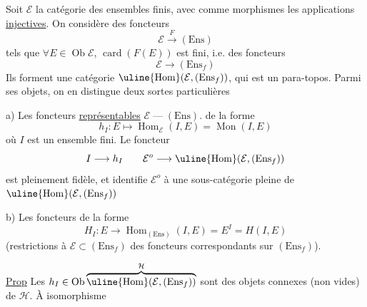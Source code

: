 Soit $\mathcal E$ la catégorie des ensembles finis, avec comme
morphismes les applications \uline{injectives}. On
considère des foncteurs
\[
\mathcal E\xrightarrow{F}(\mathrm{Ens})
\]
tels que $\forall E\in\operatorname{Ob}\mathcal E$, $\operatorname{card}(F(E))$ est fini, i.e. des
foncteurs
\[
\mathcal E\longrightarrow(\mathrm{Ens}_f)
\]
Ils forment une catégorie $\uline{\operatorname{Hom}}(\mathcal E,(\mathrm{Ens}_f))$,
qui est un para-topos. Parmi ses objets, on
en distingue deux sortes particulières

a) Les foncteurs \uline{représentables} $\mathcal E\mathbin{\text{---}}(\mathrm{Ens})$.
de la forme
\[
h_I:E\longmapsto\operatorname{Hom}_{\mathcal E}(I,E)=\operatorname{Mon}(I,E)
\]
où $I$ est un ensemble fini. Le foncteur
\[
I\longrightarrow h_I\qquad\mathcal E^o\longrightarrow\uline{\operatorname{Hom}}(\mathcal E,(\mathrm{Ens}_f))
\]
est pleinement fidèle, et identifie $\mathcal E^o$ à
une sous-catégorie pleine de $\uline{\operatorname{Hom}}(\mathcal E,(\mathrm{Ens}_f))$

b) Les foncteurs de la forme
\[
H_I:E\longrightarrow\operatorname{Hom}_{(\mathrm{Ens})}(I,E)=E^I=H(I,E)
\]
(restrictions à $\mathcal E\subset(\mathrm{Ens}_f)$ des foncteurs
correspondants sur $(\mathrm{Ens}_f)$).

\uline{Prop} Les $h_I\in\operatorname{Ob}\overbrace{\uline{\operatorname{Hom}}(\mathcal E,(\mathrm{Ens}_f))}^{\mathcal H}$ sont des
objets connexes (non vides) de $\mathcal H$. À isomorphisme
